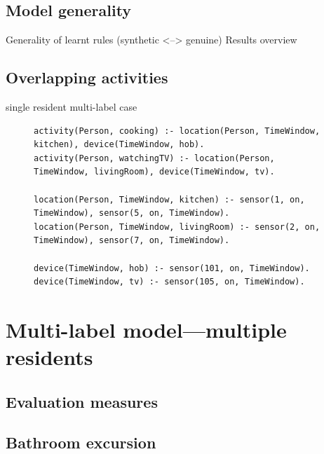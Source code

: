 \documentclass[12pt, a4paper, pdflatex, leqno, twoside, openright]{report}
\begin{document}
  \section{Model generality}
Generality of learnt rules (synthetic <--> genuine) Results overview
  \section{Overlapping activities}
single resident multi-label case


\vspace{1em}
\begin{figure}[htb]
\lstset{
  captionpos=b,
  frame=single,
  language=Prolog,
  breaklines=true,
  caption=Example of target rules.,
  label=lst:eg,
  float=tb
}
\begin{lstlisting}
activity(Person, cooking) :- location(Person, TimeWindow, kitchen), device(TimeWindow, hob).
activity(Person, watchingTV) :- location(Person, TimeWindow, livingRoom), device(TimeWindow, tv).

location(Person, TimeWindow, kitchen) :- sensor(1, on, TimeWindow), sensor(5, on, TimeWindow).
location(Person, TimeWindow, livingRoom) :- sensor(2, on, TimeWindow), sensor(7, on, TimeWindow).

device(TimeWindow, hob) :- sensor(101, on, TimeWindow).
device(TimeWindow, tv) :- sensor(105, on, TimeWindow).
\end{lstlisting}
\end{figure}





\chapter{Multi-label model---multiple residents\label{ch:mlm}}
  \section{Evaluation measures}
  \section{Bathroom excursion}
\end{document}
